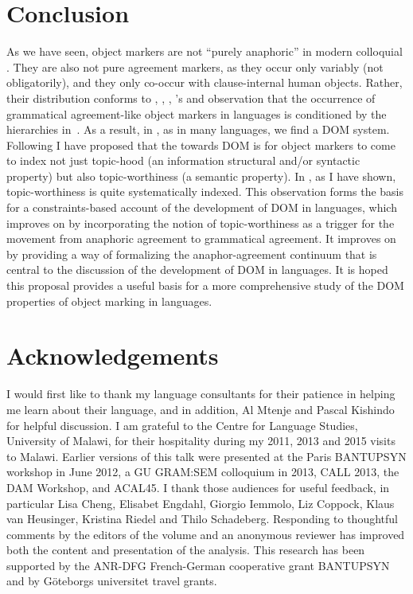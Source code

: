 \documentclass[output=paper]{LSP/langsci}
\begin{document}
\section{Conclusion}
\label{Downing-Conclusion}
As we have seen, object markers are not
“purely anaphoric” in modern colloquial . They are also not pure agreement markers, as they
occur only variably (not obligatorily), and they only co-occur with
clause-internal human objects. Rather, their distribution conforms to
, ,
, ’s and
 observation that the occurrence of grammatical agreement-like object markers in  languages is conditioned by the hierarchies in~. 
As a result, in , as in many  languages, we find a DOM system. 
Following \citet{Iemmolo2013Symmetric,Iemmolo2014Differential} I have proposed that the  towards DOM is for object markers to come to index not just topic-hood (an information
structural and/or syntactic property) but also topic-worthiness (a
semantic property). In , as I have shown, topic-worthiness is
quite systematically indexed. This observation forms the basis for a
constraints-based account of the development of DOM in 
languages, which improves on \citet{Creissels2006Typology} by
incorporating the notion of topic-worthiness as a trigger for the
movement from anaphoric agreement to grammatical agreement. 
It improves on \citet{Dalrympleetal2011Objects} by providing a way of
formalizing the anaphor-agreement continuum that is central to the
discussion of the development of DOM in  languages. 
It is hoped this proposal provides a useful basis for a more comprehensive study of the DOM properties of object marking in  languages.


\section*{Acknowledgements}
I would first like to thank my  language consultants for their
patience in helping me learn about their language, and in addition, Al
Mtenje and Pascal Kishindo for helpful discussion. I am grateful to
the Centre for Language Studies, University of Malawi, for their
hospitality during my 2011, 2013 and 2015 visits to Malawi. Earlier
versions of this talk were presented at the Paris BANTUPSYN workshop
in June 2012, a GU GRAM:SEM colloquium in 2013, CALL 2013, the DAM
Workshop, and ACAL45. I thank those audiences for useful feedback, in
particular Lisa Cheng, Elisabet Engdahl, Giorgio Iemmolo, Liz Coppock,
Klaus van Heusinger, Kristina Riedel and Thilo Schadeberg. Responding
to thoughtful comments by the editors of the volume and an anonymous
reviewer has improved both the content and presentation of the
analysis. This research has been supported by the ANR-DFG
French-German cooperative grant BANTUPSYN and by Göteborgs universitet travel grants.
\end{document}
